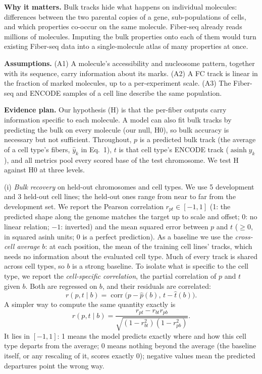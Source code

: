 \documentclass[acmtog,nonacm]{acmart}   %
\begin{document}
\textbf{Why it matters.} Bulk tracks hide what happens on individual molecules:
differences between the two parental copies of a gene, sub-populations of cells,
and which properties co-occur on the same molecule. Fiber-seq already reads millions
of molecules. Imputing the bulk properties onto each of them would turn existing
Fiber-seq data into a single-molecule atlas of many properties at once.

\textbf{Assumptions.} (A1) A molecule's accessibility and nucleosome pattern,
together with its sequence, carry information about its marks. (A2) A FC track
is linear in the fraction of marked molecules, up to a per-experiment scale.
(A3) The Fiber-seq and ENCODE samples of a cell line describe the same population.

\textbf{Evidence plan.} Our hypothesis (H) is that the per-fiber outputs carry
information specific to each molecule. A model can also fit bulk tracks by predicting
the bulk on every molecule (our null, H0), so bulk accuracy is necessary but not
sufficient. Throughout, $p$ is a predicted bulk track (the average of a cell type's
fibers, $\hat y_k$ in Eq.~1), $t$ is that cell type's ENCODE track ($\operatorname{asinh} y_k$),
and all metrics pool every scored base of the test chromosome. We test H against H0 at three levels.

(i) \emph{Bulk recovery} on held-out chromosomes and cell types. We use 5 development
and 3 held-out cell lines; the held-out ones range from near to far from the development
set. We report the Pearson correlation $r_{pt}\in[-1,1]$ (1: the predicted shape along
the genome matches the target up to scale and offset; 0: no linear relation; $-1$: inverted)
and the mean squared error between $p$ and $t$ ($\ge0$, in squared asinh units; 0 is
a perfect prediction). As a baseline we use the \emph{cross-cell average} $b$: at each
position, the mean of the training cell lines' tracks, which needs no information about
the evaluated cell type. Much of every track is shared across cell types, so $b$ is a
strong baseline. To isolate what is specific to the cell type, we report the
\emph{cell-specific correlation}, the partial correlation of $p$ and $t$ given $b$.
Both are regressed on $b$, and their residuals are correlated:
\[ r(p,t\mid b)=\operatorname{corr}\big(p-\hat p(b),\,t-\hat t(b)\big). \]
A simpler way to compute the same quantity exactly is
\[ r(p,t\mid b)=\frac{r_{pt}-r_{bt}r_{pb}}{\sqrt{(1-r_{bt}^2)(1-r_{pb}^2)}}. \]
It lies in $[-1,1]$: 1 means the model predicts exactly where and how this cell
type departs from the average; 0 means nothing beyond the average (the baseline itself,
or any rescaling of it, scores exactly 0); negative values mean the predicted departures
point the wrong way.
\end{document}
